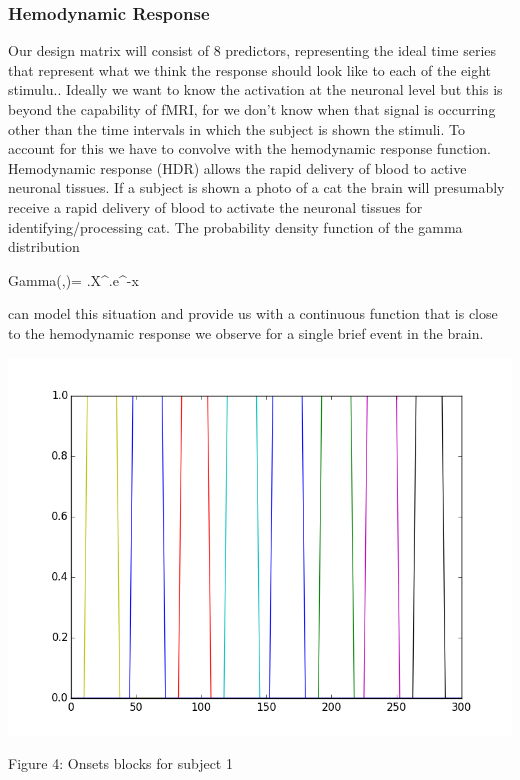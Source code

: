 \documentclass[12pt]{article}
\begin{document}
\subsubsection{Hemodynamic Response}

Our design matrix will consist of 8 predictors, representing the ideal time series 
that represent what we think the response should look like to each of the eight 
stimulu.. Ideally we want to know the activation at the neuronal level but 
this is beyond the capability of fMRI, for we don’t know when that signal 
is occurring other than the time intervals in which the subject is shown the 
stimuli. To account for this we have to convolve with the hemodynamic response 
function. Hemodynamic response (HDR) allows the rapid delivery of blood to 
active neuronal tissues. If a subject is shown a photo of a cat the brain will 
presumably receive a rapid delivery of blood to activate the neuronal tissues 
for identifying/processing cat. The probability density function of the gamma 
distribution
  

           Gamma(\alpha ,\beta )= \frac{\beta ^{\alpha }}{\Gamma (\alpha )}.X^{}.e^{-\beta x}

can model this situation and provide us with a continuous function that is 
close to the hemodynamic response we observe for a single brief event in the 
brain.

\begin{housevseverything}
    \centering
      \includegraphics[width=1\textwidth]{block}
    \caption{Figure 4: Onsets blocks for subject 1}
\end{housevseverything}
\end{document}
